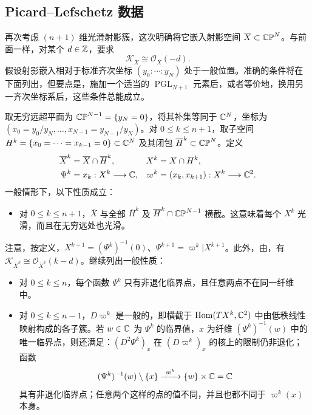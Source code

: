 \clearpage
\subsection{Picard--Lefschetz 数据}\label{sec:19c}
再次考虑 $(n+1)$ 维光滑射影簇，这次明确将它嵌入射影空间 $\overline X\subset\mathbb{CP}^N$。与前面一样，对某个 $d\in\mathbb Z$，要求
\begin{equation}\label{eq:19.5}
\mathcal K_{\overline X}\cong\mathcal O_{\overline X}(-d).
\end{equation}
假设射影嵌入相对于标准齐次坐标 $(y_0:\cdots:y_N)$ 处于一般位置。准确的条件将在下面列出，但要点是，施加一个适当的 $\operatorname{PGL}_{N+1}$ 元素后，或者等价地，换用另一齐次坐标系后，这些条件总能成立。

取无穷远超平面为 $\mathbb{CP}^{N-1}=\{y_N=0\}$，将其补集等同于 $\mathbb C^N$，坐标为 $(x_0=y_0/y_N,\ldots,x_{N-1}=y_{N-1}/y_N)$。对 $0\le k\le n+1$，取子空间 $H^k=\{x_0=\cdots=x_{k-1}=0\}\subset\mathbb C^N$ 及其闭包 $\overline H^k\subset\mathbb{CP}^N$。定义
\[
\begin{aligned}
\overline X^k&=\overline X\cap\overline H^k, &X^k&=X\cap H^k,\\
\Psi^k&=x_k:X^k\longrightarrow\mathbb C,&
\varpi^k&=(x_k,x_{k+1}):X^k\longrightarrow\mathbb C^2.
\end{aligned}
\]
一般情形下，以下性质成立：
\begin{itemize}
\item 对 $0\le k\le n+1$，$\overline X$ 与全部 $\overline H^k$ 及 $\overline H^k\cap\mathbb{CP}^{N-1}$ 横截。这意味着每个 $X^k$ 光滑，而且在无穷远处也光滑。
\end{itemize}
注意，按定义，$X^{k+1}=(\Psi^k)^{-1}(0)$、$\Psi^{k+1}=\varpi^k|X^{k+1}$。此外，由，有 $\mathcal K_{\overline X^k}\cong\mathcal O_{\overline X^k}(k-d)$。继续列出一般性质：
\begin{itemize}
\item 对 $0\le k\le n$，每个函数 $\Psi^k$ 只有非退化临界点，且任意两点不在同一纤维中。
\item 对 $0\le k\le n-1$，$D\varpi^k$ 是一般的，即横截于 $\operatorname{Hom}(TX^k,\mathbb C^2)$ 中由低秩线性映射构成的各子簇。若 $w\in\mathbb C$ 为 $\Psi^k$ 的临界值，$x$ 为纤维 $(\Psi^k)^{-1}(w)$ 中的唯一临界点，则还满足：$(D^2\Psi^k)_x$ 在 $(D\varpi^k)_x$ 的核上的限制仍非退化；函数
\[
(\Psi^k)^{-1}(w)\setminus\{x\}\xrightarrow{\ \varpi^k\ }\{w\}\times\CC=\CC
\]
具有非退化临界点；任意两个这样的点的值不同，并且也都不同于 $\varpi^k(x)$ 本身。
\end{itemize}
